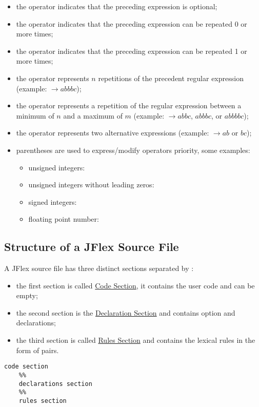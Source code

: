 \begin{itemize}
	\item the operator  indicates that the preceding expression is optional;
	\item the operator \code{*} indicates that the preceding expression can be repeated 0 or more times;
	\item the operator \code{+} indicates that the preceding expression can be repeated 1 or more times;
	\item the operator  represents $n$ repetitions of the precedent regular expression (example:  $\to abbbc$);
	\item the operator  represents a repetition of the regular expression between a minimum of $n$ and a maximum of $m$ (example:  $\to abbc$, $abbbc$, or $abbbbc$);
	\item the operator \code{\|} represents two alternative expressions (example:  $\to ab$ or $bc$);
	\item parentheses are used to express/modify operators priority, some examples:
	\begin{itemize}
		\item unsigned integers: \code{[0-9]+}
		\item unsigned integers without leading zeros: \code{[1-9][0-9]*}
		\item signed integers: 
		\item floating point number: 
	\end{itemize}
\end{itemize}

\subsection{Structure of a JFlex Source File}
A JFlex source file has three distinct sections separated by \code{\%\%}:
\begin{itemize}
	\item the first section is called \underline{Code Section}, it contains the user code and can be empty;
	\item the second section is the \underline{Declaration Section} and contains option and declarations;
	\item the third section is called \underline{Rules Section} and contains the lexical rules in the form of  pairs.
\end{itemize}
\begin{lstlisting}[frame=single]
	code section
	%%
	declarations section
	%%
	rules section
\end{lstlisting}

